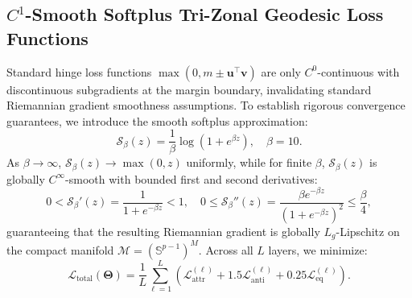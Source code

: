 \documentclass[journal]{IEEEtran}
\begin{document}
\subsection{$C^1$-Smooth Softplus Tri-Zonal Geodesic Loss Functions}
Standard hinge loss functions $\max(0, m \pm \mathbf{u}^\top \mathbf{v})$ are only $C^0$-continuous with discontinuous subgradients at the margin boundary, invalidating standard Riemannian gradient smoothness assumptions. To establish rigorous convergence guarantees, we introduce the smooth softplus approximation:
\begin{equation}
\mathcal{S}_\beta(z) = \frac{1}{\beta}\log\!\left(1 + e^{\beta z}\right), \quad \beta = 10.
\label{eq:softplus_def}
\end{equation}
As $\beta \to \infty$, $\mathcal{S}_\beta(z) \to \max(0, z)$ uniformly, while for finite $\beta$, $\mathcal{S}_\beta(z)$ is globally $C^\infty$-smooth with bounded first and second derivatives:
\begin{equation}
0 < \mathcal{S}_\beta'(z) = \frac{1}{1 + e^{-\beta z}} < 1, \quad 0 \le \mathcal{S}_\beta''(z) = \frac{\beta e^{-\beta z}}{(1 + e^{-\beta z})^2} \le \frac{\beta}{4},
\label{eq:softplus_props}
\end{equation}
guaranteeing that the resulting Riemannian gradient is globally $L_g$-Lipschitz on the compact manifold $\mathcal{M} = (\mathbb{S}^{p-1})^M$. Across all $L$ layers, we minimize:
\begin{equation}
\mathcal{L}_{\text{total}}(\boldsymbol{\Theta}) = \frac{1}{L}\sum_{\ell=1}^{L} \left( \mathcal{L}_{\text{attr}}^{(\ell)} + 1.5\mathcal{L}_{\text{anti}}^{(\ell)} + 0.25\mathcal{L}_{\text{eq}}^{(\ell)} \right).
\label{eq:total_loss}
\end{equation}
\end{document}

